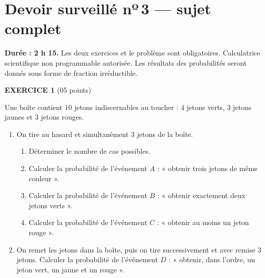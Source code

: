 \chapter*{Devoir surveillé nº\,3 — sujet complet}

\begin{devoirsurveille}
\textbf{Durée : 2 h 15.} Les deux exercices et le problème sont obligatoires.
Calculatrice scientifique non programmable autorisée. Les résultats des
probabilités seront donnés sous forme de fraction irréductible.

\vspace{0.7em}
\noindent\textbf{\sffamily EXERCICE 1} \hfill \textup{(05 points)}

Une boîte contient $10$ jetons indiscernables au toucher : $4$ jetons verts,
$3$ jetons jaunes et $3$ jetons rouges.

\begin{enumerate}[label=\textbf{\arabic*.}, leftmargin=*, itemsep=0.25em]
  \item On tire au hasard et simultanément $3$ jetons de la boîte.
    \begin{enumerate}[label=\textbf{\alph*)}, leftmargin=1.4em, itemsep=0.15em]
      \item Déterminer le nombre de cas possibles. 
      \item Calculer la probabilité de l'événement
            $A$ : « obtenir trois jetons de même couleur ». 
      \item Calculer la probabilité de l'événement
            $B$ : « obtenir exactement deux jetons verts ». 
      \item Calculer la probabilité de l'événement
            $C$ : « obtenir au moins un jeton rouge ». 
    \end{enumerate}
  \item On remet les jetons dans la boîte, puis on tire successivement et
        avec remise $3$ jetons. Calculer la probabilité de l'événement
        $D$ : « obtenir, dans l'ordre, un jeton vert, un jaune et un rouge ».
\end{enumerate}


\end{devoirsurveille}
